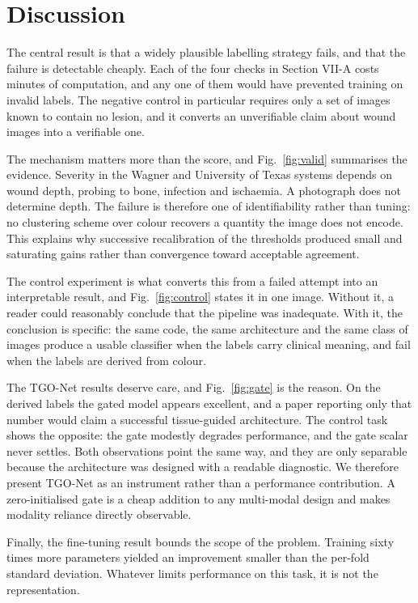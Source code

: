 \section{Discussion}

The central result is that a widely plausible labelling strategy fails, and
that the failure is detectable cheaply. Each of the four checks in
Section VII-A costs minutes of computation, and any one of them would have
prevented training on invalid labels. The negative control in particular
requires only a set of images known to contain no lesion, and it converts
an unverifiable claim about wound images into a verifiable one.

The mechanism matters more than the score, and Fig.~\ref{fig:valid}
summarises the evidence. Severity in the Wagner and
University of Texas systems depends on wound depth, probing to bone,
infection and ischaemia. A photograph does not determine depth. The failure
is therefore one of identifiability rather than tuning: no clustering
scheme over colour recovers a quantity the image does not encode. This
explains why successive recalibration of the thresholds produced small and
saturating gains rather than convergence toward acceptable agreement.

The control experiment is what converts this from a failed attempt into an
interpretable result, and Fig.~\ref{fig:control} states it in one image. Without it, a reader could reasonably conclude that
the pipeline was inadequate. With it, the conclusion is specific: the same
code, the same architecture and the same class of images produce a usable
classifier when the labels carry clinical meaning, and fail when the labels
are derived from colour.

The TGO-Net results deserve care, and Fig.~\ref{fig:gate} is the reason. On the derived labels the gated model
appears excellent, and a paper reporting only that number would claim a
successful tissue-guided architecture. The control task shows the opposite:
the gate modestly degrades performance, and the gate scalar never
settles. Both observations point the same way, and they are only separable
because the architecture was designed with a readable diagnostic. We
therefore present TGO-Net as an instrument rather than a performance
contribution. A zero-initialised gate is a cheap addition to any
multi-modal design and makes modality reliance directly observable.

Finally, the fine-tuning result bounds the scope of the problem. Training
sixty times more parameters yielded an improvement smaller than the
per-fold standard deviation. Whatever limits performance on this task, it
is not the representation.

